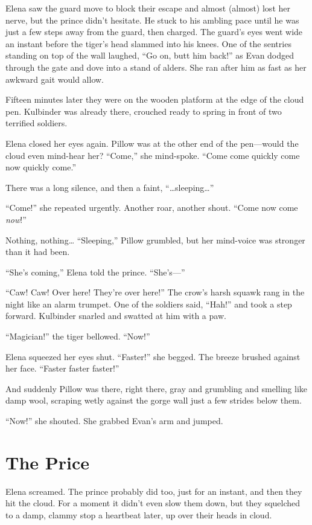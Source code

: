 \documentclass[10pt]{book}
\begin{document}
Elena saw the guard move to block their escape and almost (almost) lost her nerve, but the prince didn't hesitate. He stuck to his ambling pace until he was just a few steps away from the guard, then charged. The guard's eyes went wide an instant before the tiger's head slammed into his knees. One of the sentries standing on top of the wall laughed, ``Go on, butt him back!'' as Evan dodged through the gate and dove into a stand of alders.  She ran after him as fast as her awkward gait would allow.

Fifteen minutes later they were on the wooden platform at the edge of the cloud pen.  Kulbinder was already there, crouched ready to spring in front of two terrified soldiers.

Elena closed her eyes again.  Pillow was at the other end of the pen---would the cloud even mind-hear her?  ``Come,'' she mind-spoke.  ``Come come quickly come now quickly come.''

There was a long silence, and then a faint, ``{\ldots}sleeping{\ldots}''

``Come!'' she repeated urgently.  Another roar, another shout.  ``Come now come \emph{now}!''

Nothing, nothing{\ldots} ``Sleeping,'' Pillow grumbled, but her mind-voice was stronger than it had been.

``She's coming,'' Elena told the prince.  ``She's---''

``Caw!  Caw!  Over here!  They're over here!''  The crow's harsh squawk rang in the night like an alarm trumpet.  One of the soldiers said, ``Hah!'' and took a step forward.  Kulbinder snarled and swatted at him with a paw.

``Magician!'' the tiger bellowed.  ``Now!''

Elena squeezed her eyes shut.  ``Faster!'' she begged.  The breeze brushed against her face.  ``Faster faster faster!''

And suddenly Pillow was there, right there, gray and grumbling and smelling like damp wool, scraping wetly against the gorge wall just a few strides below them.

``Now!'' she shouted.  She grabbed Evan's arm and jumped.

\chapter{The Price}

Elena screamed.  The prince probably did too, just for an instant, and then they hit the cloud.  For a moment it didn't even slow them down, but they squelched to a damp, clammy stop a heartbeat later, up over their heads in cloud.
\end{document}
